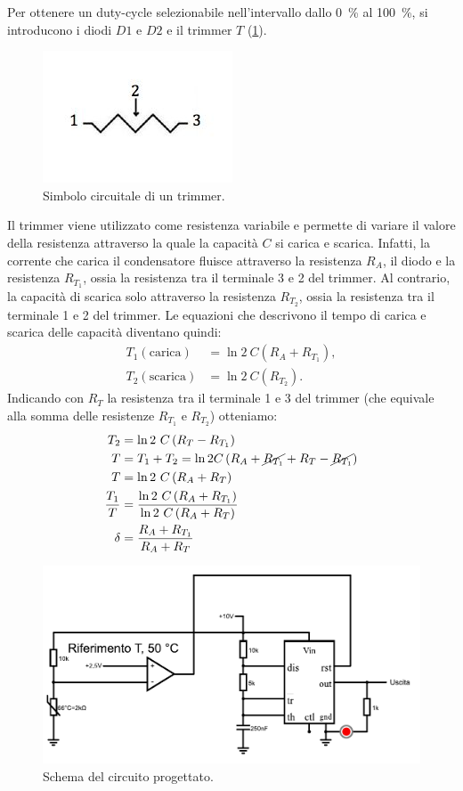 \noindent
Per ottenere un duty-cycle selezionabile nell'intervallo dallo \SI{0}{\percent} al \SI{100}{\percent}, si introducono i diodi $D1$ e $D2$ e il trimmer $T$ (\Fig\ref{fig:trimmer}).
\begin{figure}[tbh]
	\centering
	\includegraphics[width=0.2\linewidth]{./ImageFiles/Laboratorio 5/trimmer.jpg}
	\caption{Simbolo circuitale di un trimmer.}
	\label{fig:trimmer}
\end{figure}
Il trimmer viene utilizzato come resistenza variabile e permette di variare il valore della resistenza attraverso la quale la capacità $C$ si carica e scarica. Infatti, la corrente che carica il condensatore fluisce attraverso la resistenza $R_A$, il diodo e la resistenza $R_{T_1}$, ossia la resistenza tra il terminale 3 e 2 del trimmer. Al contrario, la capacità di scarica solo attraverso la resistenza $R_{T_2}$, ossia la resistenza tra il terminale 1 e 2 del trimmer. Le equazioni che descrivono il tempo di carica e scarica delle capacità diventano quindi:
\begin{equation}
	\begin{split}
		T_1(\text{carica})&=\ln{2}\ C\left(R_A+R_{T_1}\right), \\
		T_2(\text{scarica})&=\ln{2}\ C\left(R_{T_2}\right).
	\end{split}
\end{equation}
Indicando con $R_T$ la resistenza tra il terminale 1 e 3 del trimmer (che equivale alla somma delle resistenze $R_{T_1}$ e $R_{T_2}$) otteniamo:
\begin{equation}
	\begin{split}
		T_2&=\ln{2}\ C\left(R_T-R_{T_1}\right) \\
		T&=T_1+T_2=\ln{2} C\left(R_A+\cancel{R_{T_1}}+R_T-\cancel{R_{T_1}}\right) \\
		T&=\ln{2}\ C\left(R_A+R_T\right) \\
		\frac{T_1}{T}&=\frac{\ln{2}\ C\left(R_A+R_{T_1}\right)}{\ln{2}\ C\left(R_A+R_T\right)} \\
		\delta&=\frac{R_A+R_{T_1}}{R_A+R_T}
	\end{split}
\end{equation}

\clearpage
\begin{figure}[tbh]
	\centering
	\includegraphics[width=\linewidth]{./ImageFiles/Laboratorio 5/esercizio per casa}
	\caption{Schema del circuito progettato.}
	\label{fig:esercizio}
\end{figure}